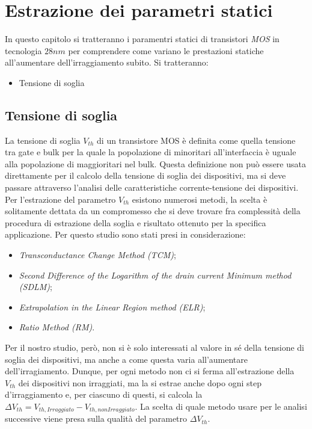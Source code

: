 
\chapter{Estrazione dei parametri statici}
In questo capitolo si tratteranno i paramentri statici di transistori \emph{MOS} in tecnologia $28 nm$ per comprendere come variano le prestazioni statiche all'aumentare dell'irraggiamento subito. Si tratteranno:
\begin{itemize}
  \item Tensione di soglia
\end{itemize}
\section{Tensione di soglia}

La tensione di soglia $V_{th}$ di un transistore MOS è definita come quella tensione tra gate e bulk per la quale la popolazione di minoritari all'interfaccia è uguale alla popolazione di maggioritari nel bulk. Questa definizione non può essere usata direttamente per il calcolo della tensione di soglia dei dispositivi, ma si deve passare attraverso l'analisi delle caratteristiche corrente-tensione dei dispositivi. \\
Per l'estrazione del parametro $V_{th}$ esistono numerosi metodi\cite{art2}, la scelta è solitamente dettata da un compromesso che si deve trovare fra complessità della procedura di estrazione della soglia e risultato ottenuto per la specifica applicazione. Per questo studio sono stati presi in considerazione:

\begin{itemize}
  \item \emph{Transconductance Change Method (TCM)};
  \item \emph{Second Difference of the Logarithm of the drain current Minimum method (SDLM)};
  \item \emph{Extrapolation in the Linear Region method (ELR)};
  \item \emph{Ratio Method (RM)}. 
\end{itemize}

Per il nostro studio, però, non si è solo interessati al valore in sé della tensione di soglia dei dispositivi, ma anche a come questa varia all'aumentare dell'irragiamento. Dunque, per ogni metodo non ci si ferma all'estrazione della $V_{th}$ dei dispositivi non irraggiati, ma la si estrae anche dopo ogni step d'irraggiamento e, per ciascuno di questi, si calcola la $\Delta V_{th} = V_{th, Irraggiato}-V_{th, non Irraggiato}$. La scelta di quale metodo usare per le analisi successive viene presa sulla qualità del parametro $\Delta V_{th}$.

